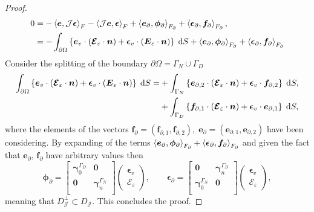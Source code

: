\begin{theorem}
\begin{proof}
\begin{align*}
0 &=-\inner[F]{\bm{e}}{\mathcal{J}\bm{\epsilon}} - \inner[F]{\mathcal{J}\bm{e}}{\bm{\epsilon}}+ \inner[F_\partial]{\bm{e}_{\partial}}{\bm{\phi}_{\partial}} +  \inner[F_\partial]{\bm{\epsilon}_{\partial}}{\bm{f}_{\partial}}, \\
&=-\int_{\partial\Omega} \left\{\bm{e}_v \cdot (\bm{\mathcal{E}}_\varepsilon \cdot \bm{n}) + \bm{\epsilon}_v \cdot (\bm{{E}}_\varepsilon \cdot \bm{n})\right\}  \d{S} + \inner[F_\partial]{\bm{e}_{\partial}}{\bm{\phi}_{\partial}} +  \inner[F_\partial]{\bm{\epsilon}_{\partial}}{\bm{f}_{\partial}}
\end{align*}
Consider the splitting of the boundary $\partial\Omega = \Gamma_N \cup \Gamma_D$
\begin{align*}
	\int_{\partial\Omega} \left\{\bm{e}_v \cdot (\bm{\mathcal{E}}_\varepsilon \cdot \bm{n}) + \bm{\epsilon}_v \cdot (\bm{{E}}_\varepsilon \cdot \bm{n})\right\}  \d{S} 
	=& +\int_{\Gamma_N} \left\{\bm{e}_{\partial, 2} \cdot (\bm{\mathcal{E}}_\varepsilon \cdot \bm{n}) + \bm{\epsilon}_v \cdot \bm{f}_{\partial, 2}\right\}  \d{S}, \\
	&+ \int_{\Gamma_D} \left\{\bm{f}_{\partial, 1} \cdot (\bm{\mathcal{E}}_\varepsilon \cdot \bm{n}) + \bm{\epsilon}_v \cdot \bm{e}_{\partial, 1}\right\}  \d{S},
\end{align*}
where the elements of the vectors $\bm{f}_{\partial} = (\bm{f}_{\partial, 1}, \bm{f}_{\partial, 2}), \; \bm{e}_{\partial} = (\bm{e}_{\partial, 1}, \bm{e}_{\partial, 2})$ have been considering. By expanding of the terms $\inner[F_\partial]{\bm{e}_{\partial}}{\bm{\phi}_{\partial}} +  \inner[F_\partial]{\bm{\epsilon}_{\partial}}{\bm{f}_{\partial}}$ and given the fact that $\bm{e}_\partial, \, \bm{f}_\partial$ have arbitrary values then
\begin{equation*}
\bm{\phi}_{\partial} = \begin{bmatrix}
\bm\gamma_{0}^{\Gamma_D} & \bm{0} \\
\bm{0} & \bm\gamma_n^{\Gamma_N} \\
\end{bmatrix} \begin{pmatrix}
\bm{\epsilon}_v \\
\bm{\mathcal{E}}_\varepsilon
\end{pmatrix}, \qquad 
\bm{\epsilon}_{\partial} = 
\begin{bmatrix}
\bm{0} & \bm\gamma_{n}^{\Gamma_D} \\
\bm\gamma_0^{\Gamma_N} & \bm{0} \\
\end{bmatrix}
\begin{pmatrix}
\bm{\epsilon}_v \\
\bm{\mathcal{E}}_\varepsilon
\end{pmatrix},
\end{equation*}
meaning that ${D}_{\mathcal{J}}^\perp \subset {D}_{\mathcal{J}}$. This concludes the proof. 
\end{proof}
\end{theorem}
